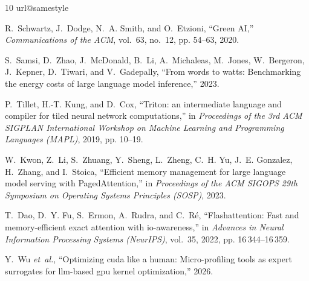 \documentclass[10pt,journal,compsoc]{IEEEtran}
\begin{document}
\begin{thebibliography}{10}
\providecommand{\url}[1]{#1}
\csname url@samestyle\endcsname
\providecommand{\newblock}{\relax}
\providecommand{\bibinfo}[2]{#2}
\providecommand{\BIBentrySTDinterwordspacing}{\spaceskip=0pt\relax}
\providecommand{\BIBentryALTinterwordstretchfactor}{4}
\providecommand{\BIBentryALTinterwordspacing}{\spaceskip=\fontdimen2\font plus
\BIBentryALTinterwordstretchfactor\fontdimen3\font minus
  \fontdimen4\font\relax}
\providecommand{\BIBforeignlanguage}[2]{{%
\expandafter\ifx\csname l@#1\endcsname\relax
\typeout{** WARNING: IEEEtran.bst: No hyphenation pattern has been}%
\typeout{** loaded for the language `#1'. Using the pattern for}%
\typeout{** the default language instead.}%
\else
\language=\csname l@#1\endcsname
\fi
#2}}
\providecommand{\BIBdecl}{\relax}
\BIBdecl

R.~Schwartz, J.~Dodge, N.~A. Smith, and O.~Etzioni, ``Green {AI},''
  \emph{Communications of the ACM}, vol.~63, no.~12, pp. 54--63, 2020.

S.~Samsi, D.~Zhao, J.~McDonald, B.~Li, A.~Michaleas, M.~Jones, W.~Bergeron,
  J.~Kepner, D.~Tiwari, and V.~Gadepally, ``From words to watts: Benchmarking
  the energy costs of large language model inference,'' 2023.

P.~Tillet, H.-T. Kung, and D.~Cox, ``Triton: an intermediate language and
  compiler for tiled neural network computations,'' in \emph{Proceedings of the
  3rd ACM SIGPLAN International Workshop on Machine Learning and Programming
  Languages (MAPL)}, 2019, pp. 10--19.

W.~Kwon, Z.~Li, S.~Zhuang, Y.~Sheng, L.~Zheng, C.~H. Yu, J.~E. Gonzalez,
  H.~Zhang, and I.~Stoica, ``Efficient memory management for large language
  model serving with {P}aged{A}ttention,'' in \emph{Proceedings of the ACM
  SIGOPS 29th Symposium on Operating Systems Principles (SOSP)}, 2023.

T.~Dao, D.~Y. Fu, S.~Ermon, A.~Rudra, and C.~R{\'e}, ``Flashattention: Fast and
  memory-efficient exact attention with io-awareness,'' in \emph{Advances in
  Neural Information Processing Systems (NeurIPS)}, vol.~35, 2022, pp.
  16\,344--16\,359.

Y.~Wu \emph{et~al.}, ``Optimizing cuda like a human: Micro-profiling tools as
  expert surrogates for llm-based gpu kernel optimization,'' 2026.


\end{thebibliography}
\end{document}
